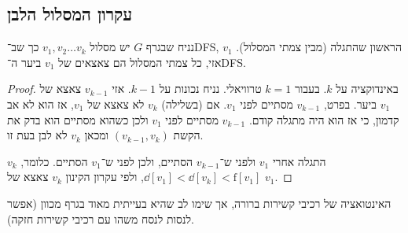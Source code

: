 \documentclass[]{../../../../tex/classes/styledArticle}
\newcommand\ff{\mathrm{f}}
\begin{document}
	\subsection*{עקרון המסלול הלבן}
	נניח שבגרף $G$ יש מסלול $v_1, v_2 \dots v_k$ כך שב־DFS, $v_1$ הראשון שהתגלה (מבין צמתי המסלול). אזי, כל צמתי המסלול הם צאצאים של $v_1$ ביער ה־DFS. \begin{proof}
		באינדוקציה על $k$. בעבור $k = 1$ טרוויאלי. נניח נכונות על $k - 1$. אזי $v_{k - 1}$ צאצא של $v_1$ ביער. בפרט, $v_{k - 1}$ מסתיים לפני $v_1$. אם (בשלילה) $v_k$ לא צאצא של $v_1$, אז הוא לא אב קדמון, כי אז הוא היה מתגלה קודם. $v_{k - 1}$ מסתיים לפני $v_1$ ולכן כשהוא מסתיים הוא בדק את הקשת $(v_{k - 1}, v_k)$ ומכאן $v_k$ לא לבן בעת זו. 
		
		$v_k$ התגלה אחרי $v_1$ ולפני ש־$v_{k -1}$ הסתיים, ולכן לפני ש־$v_1$ הסתיים. כלומר, $\dd[v_1] < \dd[v_k] < \ff[v_1]$, ולפי עקרון הקינון $v_k$ צאצא של $v_1$. 
	\end{proof}
	האינטואציה של רכיבי קשירות ברורה, אך שימו לב שהיא בעייתית מאוד בגרף מכוון (אפשר לנסות לנסח משהו עם רכיבי קשירות חזקה). 
	
\end{document}
